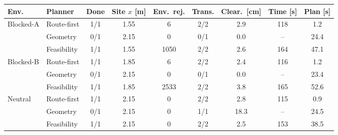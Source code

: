 \setlength{\tabcolsep}{2.2pt}
\begin{tabular}{llccccccc}
\toprule
Env. & Planner & Done & Site $x$ [m] & Env.\ rej. & Trans. & Clear.\ [cm] & Time [s] & Plan [s] \\
\midrule
Blocked-A & Route-first & 1/1 & 1.55 & 6 & 2/2 & 2.9 & 118 & 1.2 \\
 & Geometry & 0/1 & 2.15 & 0 & 0/1 & 0.0 & -- & 24.4 \\
 & Feasibility & 1/1 & 1.55 & 1050 & 2/2 & 2.6 & 164 & 47.1 \\
\midrule
Blocked-B & Route-first & 1/1 & 1.85 & 6 & 2/2 & 2.4 & 116 & 1.2 \\
 & Geometry & 0/1 & 2.15 & 0 & 0/1 & 0.0 & -- & 23.4 \\
 & Feasibility & 1/1 & 1.85 & 2533 & 2/2 & 3.8 & 165 & 52.6 \\
\midrule
Neutral & Route-first & 1/1 & 2.15 & 0 & 2/2 & 2.8 & 115 & 0.9 \\
 & Geometry & 0/1 & 2.15 & 0 & 1/1 & 18.3 & -- & 24.5 \\
 & Feasibility & 1/1 & 2.15 & 0 & 2/2 & 2.5 & 153 & 38.5 \\
\bottomrule
\end{tabular}
